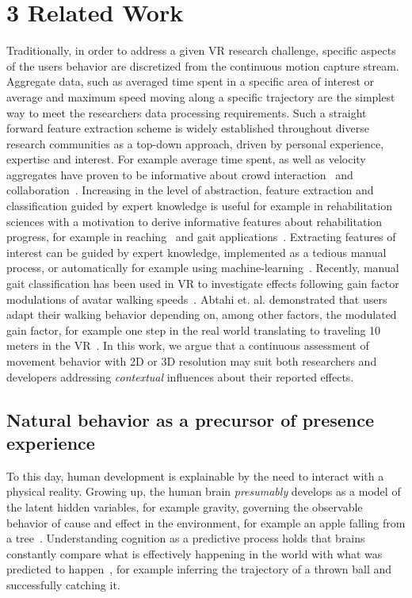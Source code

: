 \section{3 Related Work}
Traditionally, in order to address a given VR research challenge, specific aspects of the users behavior are discretized from the continuous motion capture stream. Aggregate data, such as averaged time spent in a specific area of interest or average and maximum speed moving along a specific trajectory are the simplest way to meet the researchers data processing requirements. Such a straight forward feature extraction scheme is widely established throughout diverse research communities as a top-down approach, driven by personal experience, expertise and interest. For example average time spent, as well as velocity aggregates have proven to be informative about crowd interaction~\cite{Nelson2019} and collaboration~\cite{Rios2018}. Increasing in the level of abstraction, feature extraction and classification guided by expert knowledge is useful for example in rehabilitation sciences with a motivation to derive informative features about rehabilitation progress, for example in reaching~\cite{DeLosReyes-Guzman2014} and gait applications~\cite{Taborri2016}. Extracting features of interest can be guided by expert knowledge, implemented as a tedious manual process, or automatically for example using  machine-learning~\cite{Butepage2017}. Recently, manual gait classification has been used in VR to investigate effects following gain factor modulations of avatar walking speeds~\cite{Abtahi2019}. Abtahi et. al. demonstrated that users adapt their walking behavior depending on, among other factors, the modulated gain factor, for example one step in the real world translating to traveling 10 meters in the VR~\cite{Abtahi2019}. In this work, we argue that a continuous assessment of movement behavior with 2D or 3D resolution may suit both researchers and developers addressing \textit{contextual} influences about their reported effects.

\subsection{Natural behavior as a precursor of presence experience}
To this day, human development is explainable by the need to interact with a physical reality. Growing up, the human brain \textit{presumably} develops as a model of the latent hidden variables, for example gravity, governing the observable behavior of cause and effect in the environment, for example an apple falling from a tree~\cite{Friston2010}. Understanding cognition as a predictive process holds that brains constantly compare what is effectively happening in the world with what was predicted to happen~\cite{Clark2013}, for example inferring the trajectory of a thrown ball and successfully catching it. 

